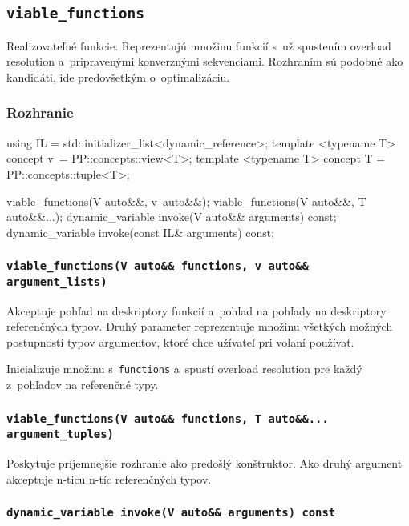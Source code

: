 \subsection{\texttt{viable\_functions}}

Realizovateľné funkcie. Reprezentujú množinu funkcií s~už spustením overload resolution a~pripravenými konverznými sekvenciami. Rozhraním sú podobné ako kandidáti, ide predovšetkým o~optimalizáciu.

\subsubsection{Rozhranie}

\begin{code}[fontsize=\footnotesize]
using IL = std::initializer_list<dynamic_reference>;
template <typename T> concept v~= PP::concepts::view<T>;
template <typename T> concept T = PP::concepts::tuple<T>;

viable_functions(V auto&&, v~auto&&);
viable_functions(V auto&&, T auto&&...);
dynamic_variable invoke(V auto&& arguments) const;
dynamic_variable invoke(const IL& arguments) const;
\end{code}

\subsubsection{\texttt{viable\_functions(V auto\&\& functions, v~auto\&\& argument\_lists)}}

Akceptuje pohľad na deskriptory funkcií a~pohľad na pohľady na deskriptory referenčných typov. Druhý parameter reprezentuje množinu všetkých možných postupností typov argumentov, ktoré chce užívateľ pri volaní používať.

Inicializuje množinu s~\texttt{functions} a~spustí overload resolution pre každý z~pohľadov na referenčné typy.

\subsubsection{\texttt{viable\_functions(V auto\&\& functions, T auto\&\&... argument\_tuples)}}

Poskytuje príjemnejšie rozhranie ako predošlý konštruktor. Ako druhý argument akceptuje n-ticu n-tíc referenčných typov.

\subsubsection{\texttt{dynamic\_variable invoke(V auto\&\& arguments) const}}

